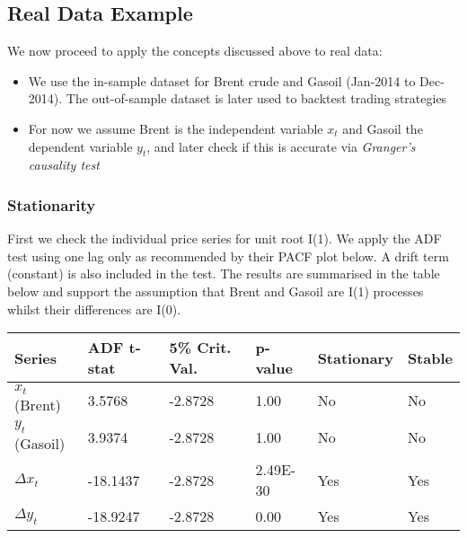 \documentclass[11pt]{article}
\begin{document}
    \subsection{Real Data Example}\label{real-data-example}
    We now proceed to apply the concepts discussed above to real data:
\begin{itemize}
\item
  We use the in-sample dataset for Brent crude and Gasoil (Jan-2014 to
  Dec-2014). The out-of-sample dataset is later used to backtest trading
  strategies
\item
  For now we assume Brent is the independent variable \(x_t\) and Gasoil
  the dependent variable \(y_t\), and later check if this is accurate
  via \emph{Granger's causality test}
\end{itemize}
    \subsubsection{Stationarity}\label{stationarity}
First we check the individual price series for unit root I(1). We apply the ADF test using one lag only as recommended by
their PACF plot below. A drift term (constant) is also included in the
test. The results are summarised in the table below and support the assumption that Brent
and Gasoil are I(1) processes whilst their differences are I(0).
    \begin{longtable}[]{@{}llllll@{}}
\toprule
Series & ADF t-stat & 5\% Crit. Val. & p-value & Stationary &
Stable\tabularnewline
\midrule
\endhead
\(x_t\) (Brent) & 3.5768 & -2.8728 & 1.00 & No & No\tabularnewline
\(y_t\) (Gasoil) & 3.9374 & -2.8728 & 1.00 & No & No\tabularnewline
\(\Delta x_t\) & -18.1437 & -2.8728 & 2.49E-30 & Yes &
Yes\tabularnewline
\(\Delta y_t\) & -18.9247 & -2.8728 & 0.00 & Yes & Yes\tabularnewline
\bottomrule
\end{longtable}
    \begin{center}
    \end{center}
    { \hspace*{\fill} \\}
\end{document}
